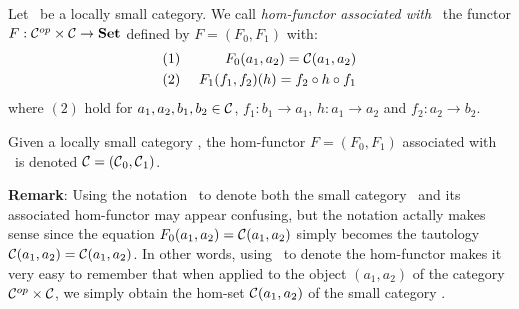 \begin{defin}\label{Fun:def:hom:functor}
    Let \Cat\ be a locally small category. We call {\em hom-functor associated
    with} \Cat\ the functor $F:\mbox{${\cal C}^{op}$}\times\mbox{$\cal C$}\to\mbox{\bf Set}$ defined by $F=(F_{0},F_{1})$
    with:
        \begin{eqnarray*}
            (1)&\ &F_{0}(a_{1},a_{2}) = \mbox{$\cal C$}(a_{1},a_{2})\\
            (2)&\ &F_{1}(f_{1},f_{2})(h) = f_{2}\circ h \circ f_{1}
        \end{eqnarray*}
    where $(2)$ hold for $a_{1},a_{2},b_{1},b_{2}\in\mbox{$\cal C$}$,
    $f_{1}:b_{1}\to a_{1}$, $h:a_{1}\to a_{2}$ and $f_{2}:a_{2}\to b_{2}$.
\end{defin}
\begin{notation}\label{Fun:notation:hom:functor}
    Given a locally small category \Cat, the hom-functor $F=(F_{0},F_{1})$ 
    associated with \Cat\ is denoted $\mbox{$\cal C$}=(\mbox{$\cal C$}_{0},\mbox{$\cal C$}_{1})$.
\end{notation}
\noindent
{\bf Remark}: Using the notation \Cat\ to denote both the small category
\Cat\ and its associated hom-functor may appear confusing, but the notation
actally makes sense since the equation $F_{0}(a_{1},a_{2})=
\mbox{$\cal C$}(a_{1},a_{2})$ simply becomes the tautology $\mbox{$\cal C$}(a_{1},a_{2})
=\mbox{$\cal C$}(a_{1},a_{2})$. In other words, using \Cat\ to denote the hom-functor 
makes it very easy to remember that when applied to the object $(a_{1},a_{2})$
of the category $\mbox{${\cal C}^{op}$}\times\mbox{$\cal C$}$, we simply obtain the hom-set 
$\mbox{$\cal C$}(a_{1},a_{2})$ of the small category \Cat.

